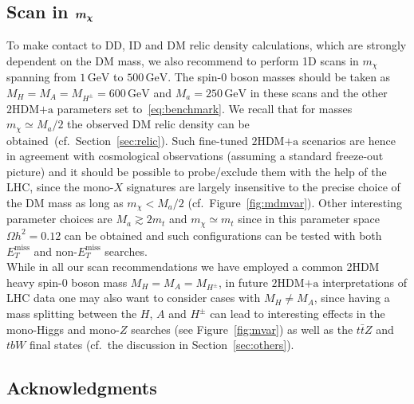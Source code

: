 \documentclass[review]{elsarticle}
\newcommand{\MET}{\ensuremath{E_T^\mathrm{miss}}\xspace}
\newcommand{\mA}{\ensuremath{M_{A}}\xspace}
\newcommand{\ma}{\ensuremath{M_{a}}\xspace}
\newcommand{\mH}{\ensuremath{M_{H}}\xspace}
\newcommand{\mHc}{\ensuremath{M_{H^{\pm}}}\xspace}
\newcommand{\hdma}{\ensuremath{\textrm{2HDM+a}}\xspace}
\def\bm#1{\mbox{\boldmath$#1$\unboldmath}}
\begin{document}
\subsection[Scan in $m_\chi$]{Scan in $\bm{m_\chi}$}

To make contact to DD, ID and DM relic density calculations, which are strongly dependent on the DM mass, we also recommend to perform 1D scans in $m_\chi$ spanning from $1\, {\mathrm{GeV}}$ to $500 \, {\mathrm{GeV}}$. The  spin-0 boson masses should be taken as $\mH = \mA = \mHc = 600 \, {\mathrm{GeV}}$ and $\ma = 250 \, {\mathrm{GeV}}$  in these scans and the other \hdma parameters set to~\eqref{eq:benchmark}. We recall that for masses $m_\chi \simeq \ma/2$ the observed DM relic density can be obtained~(cf.~Section~\ref{sec:relic}). Such fine-tuned \hdma scenarios are hence in agreement with cosmological observations (assuming a standard freeze-out picture) and  it should be possible to probe/exclude them with the help of the LHC, since the mono-$X$ signatures are largely insensitive to the precise choice of the DM mass as long as $m_\chi < \ma/2$  (cf.~Figure~\ref{fig:mdmvar}). Other interesting parameter choices are $M_a \gtrsim 2 m_t$ and $m_\chi \simeq m_t$  since in this parameter space $\Omega h^2 = 0.12$ can be obtained and such configurations can be tested with both $\MET$ and non-$\MET$ searches. \\[2mm]

\noindent While in all our scan recommendations we have employed a common 2HDM heavy  spin-0 boson  mass $\mH = \mA = \mHc$, in future \hdma interpretations of LHC data one may also want to consider cases with $M_H \neq M_A$, since having a mass splitting between the $H$, $A$ and $H^\pm$ can lead to interesting effects in the mono-Higgs and mono-$Z$ searches (see Figure~\ref{fig:mvar}) as well as the $t \bar t Z$ and $tbW$ final states (cf.~the discussion in Section~\ref{sec:others}).  


\subsection*{Acknowledgments} 
\end{document}
